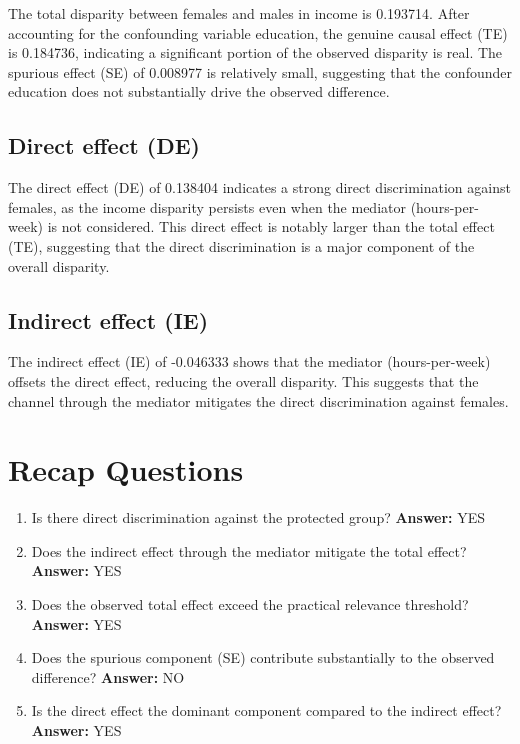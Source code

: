 \documentclass[11pt]{article}
\begin{document}
The total disparity between females and males in income is 0.193714. After accounting for the confounding variable education, the genuine causal effect (TE) is 0.184736, indicating a significant portion of the observed disparity is real. The spurious effect (SE) of 0.008977 is relatively small, suggesting that the confounder education does not substantially drive the observed difference.

\subsection{Direct effect (DE)}

The direct effect (DE) of 0.138404 indicates a strong direct discrimination against females, as the income disparity persists even when the mediator (hours-per-week) is not considered. This direct effect is notably larger than the total effect (TE), suggesting that the direct discrimination is a major component of the overall disparity.

\subsection{Indirect effect (IE)}

The indirect effect (IE) of -0.046333 shows that the mediator (hours-per-week) offsets the direct effect, reducing the overall disparity. This suggests that the channel through the mediator mitigates the direct discrimination against females.

\section{Recap Questions}

\begin{enumerate}
\item Is there direct discrimination against the protected group? \textbf{Answer:} YES
\item Does the indirect effect through the mediator mitigate the total effect? \textbf{Answer:} YES
\item Does the observed total effect exceed the practical relevance threshold? \textbf{Answer:} YES
\item Does the spurious component (SE) contribute substantially to the observed difference? \textbf{Answer:} NO
\item Is the direct effect the dominant component compared to the indirect effect? \textbf{Answer:} YES
\end{enumerate}
\end{document}
